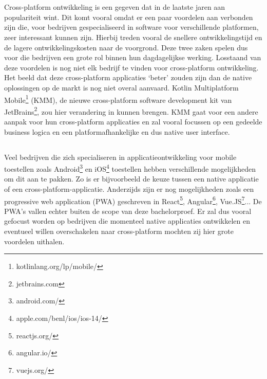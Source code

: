 
\chapter{}
\label{ch:inleiding}

Cross-platform ontwikkeling is een gegeven dat in de laatste jaren aan populariteit wint. Dit komt vooral omdat er een paar voordelen aan verbonden zijn die, voor bedrijven gespecialiseerd in software voor verschillende platformen, zeer interessant kunnen zijn. Hierbij treden vooral de snellere ontwikkelingstijd en de lagere ontwikkelingskosten naar de voorgrond. Deze twee zaken spelen dus voor die bedrijven een grote rol binnen hun dagdagelijkse werking. Losstaand van deze voordelen is nog niet elk bedrijf te vinden voor cross-platform ontwikkeling. Het beeld dat deze cross-platform applicaties `beter' zouden zijn dan de native oplossingen op de markt is nog niet overal aanvaard. Kotlin Multiplatform Mobile\footnote{kotlinlang.org/lp/mobile/} (KMM), de nieuwe cross-platform software development kit van JetBrains\footnote{jetbrains.com}, zou hier verandering in kunnen brengen. KMM gaat voor een andere aanpak voor hun cross-platform applicaties en zal vooral focussen op een gedeelde business logica en een platformafhankelijke en dus native user interface. 


\section{}
\label{sec:probleemstelling}

Veel bedrijven die zich specialiseren in applicatieontwikkeling voor mobile toestellen zoals Android\footnote{android.com/} en iOS\footnote{apple.com/benl/ios/ios-14/} toestellen hebben verschillende mogelijkheden om dit aan te pakken. Zo is er bijvoorbeeld de keuze tussen een native applicatie of een cross-platform-applicatie. Anderzijds zijn er nog mogelijkheden zoals een progressive web application (PWA) geschreven in React\footnote{reactjs.org/}, Angular\footnote{angular.io/}, Vue.JS\footnote{vuejs.org/}... De PWA's vallen echter buiten de scope van deze bachelorproef. Er zal dus vooral gefocust worden op bedrijven die momenteel native applicaties ontwikkelen en eventueel willen overschakelen naar cross-platform mochten zij hier grote voordelen uithalen.


